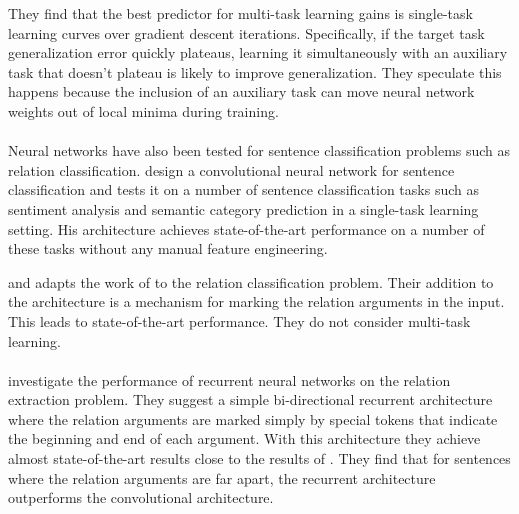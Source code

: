 They find that the best predictor for multi-task learning gains is single-task learning curves over gradient descent iterations. Specifically, if the target task generalization error quickly plateaus, learning it simultaneously with an auxiliary task that doesn't plateau is likely to improve generalization. They speculate this happens because the inclusion of an auxiliary task can move neural network weights out of local minima during training.
\\\\
Neural networks have also been tested for sentence classification problems such as relation classification. \citet{kim2014} design a convolutional neural network for sentence classification and tests it on a number of sentence classification tasks such as sentiment analysis and semantic category prediction in a single-task learning setting. His architecture achieves state-of-the-art performance on a number of these tasks without any manual feature engineering.

\citet{nguyen2015} and adapts the work of \citet{kim2014} to the relation classification problem. Their addition to the architecture is a mechanism for marking the relation arguments in the input. This leads to state-of-the-art performance. They do not consider multi-task learning.
\\\\
\citet{zhang2015} investigate the performance of recurrent neural networks on the relation extraction problem. They suggest a simple bi-directional recurrent architecture where the relation arguments are marked simply by special tokens that indicate the beginning and end of each argument. With this architecture they achieve almost state-of-the-art results close to the results of \citet{nguyen2015}. They find that for sentences where the relation arguments are far apart, the recurrent architecture outperforms the convolutional architecture.
